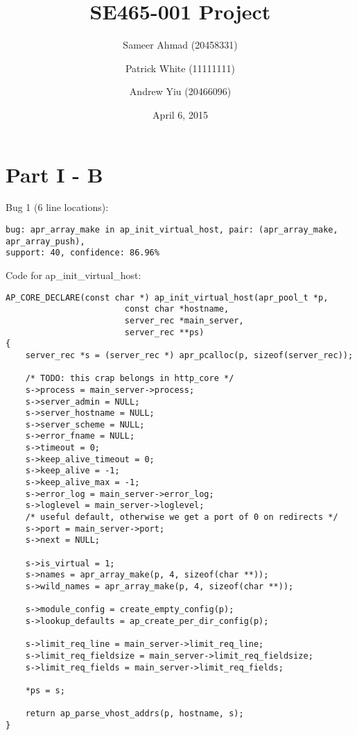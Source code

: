 \documentclass[12pt]{article}
\title{SE465-001 Project}
\author{Sameer Ahmad (20458331) \and Patrick White (11111111) \and Andrew Yiu (20466096)}
\date{April 6, 2015}
\begin{document}
\maketitle

\section{Part I - B}
Bug 1 (6 line locations):
\begin{lstlisting}
bug: apr_array_make in ap_init_virtual_host, pair: (apr_array_make, apr_array_push),
support: 40, confidence: 86.96%
\end{lstlisting}
Code for ap\_init\_virtual\_host:
\begin{lstlisting}
AP_CORE_DECLARE(const char *) ap_init_virtual_host(apr_pool_t *p,
						const char *hostname,
						server_rec *main_server,
						server_rec **ps)
{
	server_rec *s = (server_rec *) apr_pcalloc(p, sizeof(server_rec));
	
	/* TODO: this crap belongs in http_core */
	s->process = main_server->process;
	s->server_admin = NULL;
	s->server_hostname = NULL;
	s->server_scheme = NULL;
	s->error_fname = NULL;
	s->timeout = 0;
	s->keep_alive_timeout = 0;
	s->keep_alive = -1;
	s->keep_alive_max = -1;
	s->error_log = main_server->error_log;
	s->loglevel = main_server->loglevel;
	/* useful default, otherwise we get a port of 0 on redirects */
	s->port = main_server->port;
	s->next = NULL;
	
	s->is_virtual = 1;
	s->names = apr_array_make(p, 4, sizeof(char **));
	s->wild_names = apr_array_make(p, 4, sizeof(char **));
	
	s->module_config = create_empty_config(p);
	s->lookup_defaults = ap_create_per_dir_config(p);
	
	s->limit_req_line = main_server->limit_req_line;
	s->limit_req_fieldsize = main_server->limit_req_fieldsize;
	s->limit_req_fields = main_server->limit_req_fields;
	
	*ps = s;
	
	return ap_parse_vhost_addrs(p, hostname, s);
}
\end{lstlisting}
\end{document}

